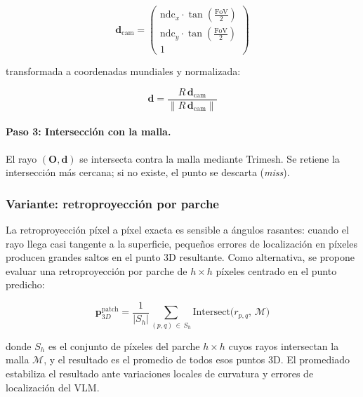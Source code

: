 \begin{equation}
    \mathbf{d}_{\text{cam}} =
    \begin{pmatrix}
        \text{ndc}_x \cdot \tan\!\left(\tfrac{\text{FoV}}{2}\right) \\[3pt]
        \text{ndc}_y \cdot \tan\!\left(\tfrac{\text{FoV}}{2}\right) \\[3pt]
        1
    \end{pmatrix}
    \label{eq:dir_cam}
\end{equation}

transformada a coordenadas mundiales y normalizada:

\begin{equation}
    \mathbf{d} = \frac{R\,\mathbf{d}_{\text{cam}}}{\|R\,\mathbf{d}_{\text{cam}}\|}
    \label{eq:dir_world}
\end{equation}

\paragraph{Paso 3: Intersección con la malla.}
El rayo $(\mathbf{O}, \mathbf{d})$ se intersecta contra la malla mediante Trimesh.
Se retiene la intersección más cercana; si no existe, el punto se descarta
(\textit{miss}).

\subsubsection{Variante: retroproyección por parche}
\label{sec:patchified}

La retroproyección píxel a píxel exacta es sensible a ángulos rasantes: cuando el
rayo llega casi tangente a la superficie, pequeños errores de localización en
píxeles producen grandes saltos en el punto 3D resultante. Como alternativa, se
propone evaluar una retroproyección por parche de $h \times h$ píxeles centrado
en el punto predicho:

\begin{equation}
    \mathbf{p}_{3D}^{\text{patch}} =
    \frac{1}{|S_{h}|}
    \sum_{(p,q)\,\in\, S_{h}}
    \mathrm{Intersect}\!\bigl(r_{p,q},\, \mathcal{M}\bigr)
    \label{eq:patch}
\end{equation}

donde $S_{h}$ es el conjunto de píxeles del parche $h\times h$ cuyos rayos
intersectan la malla $\mathcal{M}$, y el resultado es el promedio de todos esos
puntos 3D. El promediado estabiliza el resultado ante variaciones locales de
curvatura y errores de localización del VLM.

